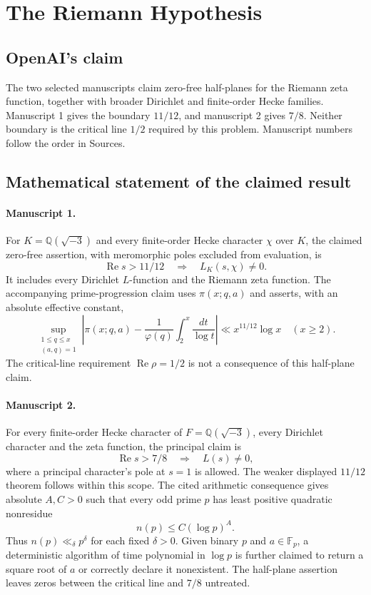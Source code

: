 \documentclass[11pt]{article}
\begin{document}
\section*{The Riemann Hypothesis}

\subsection{OpenAI's claim}
The two selected manuscripts claim zero-free half-planes for the Riemann zeta function, together with broader Dirichlet and finite-order Hecke families. Manuscript 1 gives the boundary $11/12$, and manuscript 2 gives $7/8$. Neither boundary is the critical line $1/2$ required by this problem. Manuscript numbers follow the order in Sources.

\subsection{Mathematical statement of the claimed result}
\paragraph{Manuscript 1.}
For $K=\mathbb Q(\sqrt{-3})$ and every finite-order Hecke character $\chi$ over $K$, the claimed zero-free assertion, with meromorphic poles excluded from evaluation, is
\[
 \operatorname{Re}s>11/12\quad\Longrightarrow\quad L_K(s,\chi)\ne0.
\]
It includes every Dirichlet $L$-function and the Riemann zeta function. The accompanying prime-progression claim uses $\pi(x;q,a)$ and asserts, with an absolute effective constant,
\[
 \sup_{\substack{1\le q\le x\\(a,q)=1}}
 \left|\pi(x;q,a)-\frac1{\varphi(q)}\int_2^x\frac{dt}{\log t}\right|
 \ll x^{11/12}\log x\quad(x\ge2).
\]
The critical-line requirement $\operatorname{Re}\rho=1/2$ is not a consequence of this half-plane claim.

\paragraph{Manuscript 2.}
For every finite-order Hecke character of $F=\mathbb Q(\sqrt{-3})$, every Dirichlet character and the zeta function, the principal claim is
\[
 \operatorname{Re}s>7/8\quad\Longrightarrow\quad L(s)\ne0,
\]
where a principal character's pole at $s=1$ is allowed. The weaker displayed $11/12$ theorem follows within this scope. The cited arithmetic consequence gives absolute $A,C>0$ such that every odd prime $p$ has least positive quadratic nonresidue
\[
 n(p)\le C(\log p)^A.
\]
Thus $n(p)\ll_{\delta} p^{\delta}$ for each fixed $\delta>0$. Given binary $p$ and $a\in\mathbb F_p$, a deterministic algorithm of time polynomial in $\log p$ is further claimed to return a square root of $a$ or correctly declare it nonexistent. The half-plane assertion leaves zeros between the critical line and $7/8$ untreated.
\end{document}
